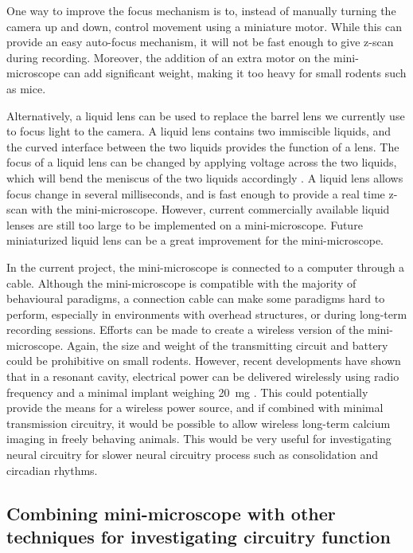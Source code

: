 One way to improve the focus mechanism is to, instead of manually turning the camera up and down, control movement using a miniature motor. While this can provide an easy auto-focus mechanism, it will not be fast enough to give z-scan during recording. Moreover, the addition of an extra motor on the mini-microscope can add significant weight, making it too heavy for small rodents such as mice. 

Alternatively, a liquid lens can be used to replace the barrel lens we currently use to focus light to the camera. A liquid lens contains two immiscible liquids, and the curved interface between the two liquids provides the function of a lens. The focus of a liquid lens can be changed by applying voltage across the two liquids, which will bend the meniscus of the two liquids accordingly \citep{kuiper04}. A liquid lens allows focus change in several milliseconds, and is fast enough to provide a real time z-scan with the mini-microscope. However, current commercially available liquid lenses are still too large to be implemented on a mini-microscope. Future miniaturized liquid lens can be a great improvement for the mini-microscope.

In the current project, the mini-microscope is connected to a computer through a cable. Although the mini-microscope is compatible with the majority of behavioural paradigms, a connection cable can make some paradigms hard to perform, especially in environments with overhead structures, or during long-term recording sessions. Efforts can be made to create a wireless version of the mini-microscope. Again, the size and weight of the transmitting circuit and battery could be prohibitive on small rodents. However, recent developments have shown that in a resonant cavity, electrical power can be delivered wirelessly using radio frequency and a minimal implant weighing \SI{20}{\mg} \citep{montgomery15}. This could potentially provide the means for a wireless power source, and if combined with minimal transmission circuitry, it would be possible to allow wireless long-term calcium imaging in freely behaving animals. This would be very useful for investigating neural circuitry for slower neural circuitry process such as consolidation and circadian rhythms. 

\subsection{Combining mini-microscope with other techniques for investigating circuitry function}

